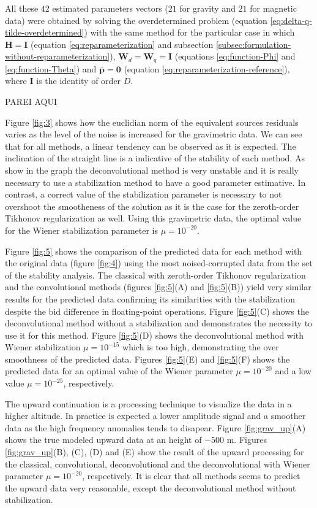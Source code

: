 All these $42$ estimated parameters vectors ($21$ for gravity and $21$ for magnetic data) were obtained by solving 
the overdetermined problem (equation \ref{eq:delta-q-tilde-overdetermined}) with the same method for the particular case in which
$\mathbf{H} = \mathbf{I}$ (equation \ref{eq:reparameterization} and 
subsection \ref{subsec:formulation-without-reparameterization}),
$\mathbf{W}_{d} = \mathbf{W}_{q} = \mathbf{I}$ (equations \ref{eq:function-Phi} and \ref{eq:function-Theta}) and
$\bar{\mathbf{p}} = \mathbf{0}$ (equation \ref{eq:reparameterization-reference}), where $\mathbf{I}$ is the identity of order $D$.

PAREI AQUI
		
Figure \ref{fig:3} shows how the euclidian norm of the equivalent sources residuals varies as the level of the noise is increased for the gravimetric data. We can see that for all methods, a linear tendency can be observed as it is expected. The inclination of the straight line is a indicative of the stability of each method. As show in the graph the deconvolutional method is very unstable and it is really necessary to use a stabilization method to have a good parameter estimative. In contrast, a correct value of the stabilization parameter is necessary to not overshoot the smootheness of the solution as it is the case for the zeroth-order Tikhonov regularization as well. Using this gravimetric data, the optimal value for the Wiener stabilization parameter is $\mu = 10^{-20}$. 

Figure \ref{fig:5} shows the comparison of the predicted data for each method with the original data (figure \ref{fig:4}) using the most noised-corrupted data from the set of the stability analysis. The classical with zeroth-order Tikhonov regularization and the convolutional methods (figures \ref{fig:5}(A) and \ref{fig:5}(B)) yield very similar results for the predicted data confirming its similarities with the stabilization despite the bid difference in floating-point operations. Figure \ref{fig:5}(C) shows the deconvolutional method without a stabilization and demonstrates the necessity to use it for this method. Figure \ref{fig:5}(D) shows the deconvolutional method with Wiener stabilization $\mu = 10^{-15}$ which is too high, demonstrating the over smoothness of the predicted data. Figures \ref{fig:5}(E) and \ref{fig:5}(F) shows the predicted data for an optimal value of the Wiener parameter $\mu = 10^{-20}$ and a low value $\mu = 10^{-25}$, respectively.

The upward continuation is a processing technique to visualize the data in a higher altitude. In practice is expected a lower amplitude signal and a smoother data as the high frequency anomalies tends to disapear. Figure  \ref{fig:grav_up}(A) shows the true modeled upward data at an height of $-500$ m. Figures \ref{fig:grav_up}(B), (C), (D) and (E) show the result of the upward processing for the classical, convolutional, deconvolutional and the deconvolutional with Wiener parameter $\mu = 10^{-20}$, respectively. It is clear that all methods seems to predict the upward data very reasonable, except the deconvolutional method without stabilization.

